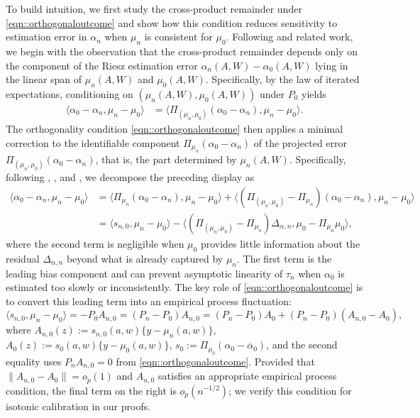 \documentclass[11pt]{article}
\theoremstyle{plain}
\begin{document}
To build intuition, we first study the cross-product remainder under \eqref{eqn::orthogonaloutcome} and show how this condition reduces sensitivity to estimation error in \(\alpha_n\) when \(\mu_n\) is consistent for \(\mu_0\). Following \cite{van2014targeted} and related work, we begin with the observation that the cross-product remainder depends only on the component of the Riesz estimation error \(\alpha_n(A,W)-\alpha_0(A,W)\) lying in the linear span of \(\mu_n(A,W)\) and \(\mu_0(A,W)\). Specifically, by the law of iterated expectations, conditioning on \((\mu_n(A,W),\mu_0(A,W))\) under \(P_0\) yields
\begin{align*}
\langle \alpha_0 - \alpha_n , \mu_n - \mu_0 \rangle
&= \langle \Pi_{(\mu_n, \mu_0)}(\alpha_0 - \alpha_n), \mu_n - \mu_0\rangle.
\end{align*}
The orthogonality condition \eqref{eqn::orthogonaloutcome} then applies a minimal correction to the identifiable component \(\Pi_{\mu_n}(\alpha_0-\alpha_n)\) of the projected error \(\Pi_{(\mu_n,\mu_0)}(\alpha_0-\alpha_n)\), that is, the part determined by \(\mu_n(A,W)\). Specifically, following \cite{benkeser2017doubly}, \cite{dukes2024doubly}, and \cite{bonvini2024doubly}, we decompose the preceding display as
\begin{equation}
\label{eqn::DRexpansion}
\begin{aligned}
\langle \alpha_0 - \alpha_n , \mu_n - \mu_0 \rangle
&= \langle \Pi_{\mu_n}(\alpha_0 - \alpha_n), \mu_n - \mu_0\rangle
  + \langle (\Pi_{(\mu_n , \mu_0)} - \Pi_{\mu_n})(\alpha_0 - \alpha_n),
           \mu_n - \mu_0\rangle \\
&= \langle s_{n,0}, \mu_n - \mu_0\rangle
  - \langle (\Pi_{(\mu_n , \mu_0)} - \Pi_{\mu_n}) \Delta_{\alpha,n},
           \mu_0 - \Pi_{\mu_n} \mu_0 \rangle,
\end{aligned}
\end{equation}
where the second term is negligible when \(\mu_0\) provides little information about the residual \(\Delta_{\alpha,n}\) beyond what is already captured by \(\mu_n\). The first term is the leading bias component and can prevent asymptotic linearity of \(\tau_n\) when \(\alpha_0\) is estimated too slowly or inconsistently. The key role of \eqref{eqn::orthogonaloutcome} is to convert this leading term into an empirical process fluctuation:
\[
\langle s_{n,0}, \mu_n - \mu_0\rangle
= - P_0 A_{n,0}
= (P_n - P_0) A_{n,0}
= (P_n-P_0) A_0 + (P_n - P_0) (A_{n,0} - A_0),
\]
where \(A_{n,0}(z) := s_{n,0}(a,w)\{y - \mu_n(a,w)\}\), \(A_0(z) := s_0(a,w)\{y - \mu_0(a,w)\}\), \(s_0 := \Pi_{\mu_0}(\alpha_0 - \overline{\alpha}_0)\), and the second equality uses \(P_n A_{n,0}=0\) from \eqref{eqn::orthogonaloutcome}. Provided that \(\|A_{n,0}-A_0\|=o_p(1)\) and \(A_{n,0}\) satisfies an appropriate empirical process condition, the final term on the right is \(o_p(n^{-1/2})\); we verify this condition for isotonic calibration in our proofs.
\end{document}
